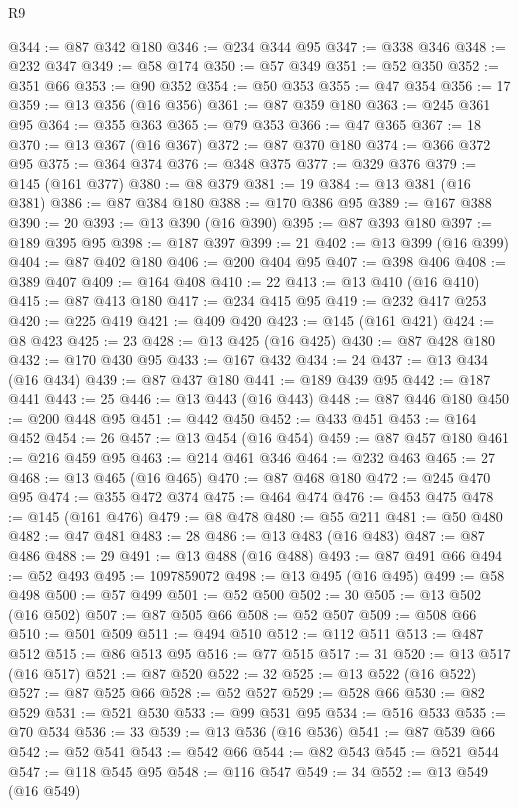\begin{lexlean}{R9}
\begin{coremodule}
@344 := @87 @342 @180
@346 := @234 @344 @95
@347 := @338 @346
@348 := @232 @347
@349 := @58 @174
@350 := @57 @349
@351 := @52 @350
@352 := @351 @66
@353 := @90 @352
@354 := @50 @353
@355 := @47 @354
@356 := 17
@359 := @13 @356 (@16 @356)
@361 := @87 @359 @180
@363 := @245 @361 @95
@364 := @355 @363
@365 := @79 @353
@366 := @47 @365
@367 := 18
@370 := @13 @367 (@16 @367)
@372 := @87 @370 @180
@374 := @366 @372 @95
@375 := @364 @374
@376 := @348 @375
@377 := @329 @376
@379 := @145 (@161 @377)
@380 := @8 @379
@381 := 19
@384 := @13 @381 (@16 @381)
@386 := @87 @384 @180
@388 := @170 @386 @95
@389 := @167 @388
@390 := 20
@393 := @13 @390 (@16 @390)
@395 := @87 @393 @180
@397 := @189 @395 @95
@398 := @187 @397
@399 := 21
@402 := @13 @399 (@16 @399)
@404 := @87 @402 @180
@406 := @200 @404 @95
@407 := @398 @406
@408 := @389 @407
@409 := @164 @408
@410 := 22
@413 := @13 @410 (@16 @410)
@415 := @87 @413 @180
@417 := @234 @415 @95
@419 := @232 @417 @253
@420 := @225 @419
@421 := @409 @420
@423 := @145 (@161 @421)
@424 := @8 @423
@425 := 23
@428 := @13 @425 (@16 @425)
@430 := @87 @428 @180
@432 := @170 @430 @95
@433 := @167 @432
@434 := 24
@437 := @13 @434 (@16 @434)
@439 := @87 @437 @180
@441 := @189 @439 @95
@442 := @187 @441
@443 := 25
@446 := @13 @443 (@16 @443)
@448 := @87 @446 @180
@450 := @200 @448 @95
@451 := @442 @450
@452 := @433 @451
@453 := @164 @452
@454 := 26
@457 := @13 @454 (@16 @454)
@459 := @87 @457 @180
@461 := @216 @459 @95
@463 := @214 @461 @346
@464 := @232 @463
@465 := 27
@468 := @13 @465 (@16 @465)
@470 := @87 @468 @180
@472 := @245 @470 @95
@474 := @355 @472 @374
@475 := @464 @474
@476 := @453 @475
@478 := @145 (@161 @476)
@479 := @8 @478
@480 := @55 @211
@481 := @50 @480
@482 := @47 @481
@483 := 28
@486 := @13 @483 (@16 @483)
@487 := @87 @486
@488 := 29
@491 := @13 @488 (@16 @488)
@493 := @87 @491 @66
@494 := @52 @493
@495 := 1097859072
@498 := @13 @495 (@16 @495)
@499 := @58 @498
@500 := @57 @499
@501 := @52 @500
@502 := 30
@505 := @13 @502 (@16 @502)
@507 := @87 @505 @66
@508 := @52 @507
@509 := @508 @66
@510 := @501 @509
@511 := @494 @510
@512 := @112 @511
@513 := @487 @512
@515 := @86 @513 @95
@516 := @77 @515
@517 := 31
@520 := @13 @517 (@16 @517)
@521 := @87 @520
@522 := 32
@525 := @13 @522 (@16 @522)
@527 := @87 @525 @66
@528 := @52 @527
@529 := @528 @66
@530 := @82 @529
@531 := @521 @530
@533 := @99 @531 @95
@534 := @516 @533
@535 := @70 @534
@536 := 33
@539 := @13 @536 (@16 @536)
@541 := @87 @539 @66
@542 := @52 @541
@543 := @542 @66
@544 := @82 @543
@545 := @521 @544
@547 := @118 @545 @95
@548 := @116 @547
@549 := 34
@552 := @13 @549 (@16 @549)

\end{coremodule}
\end{lexlean}
